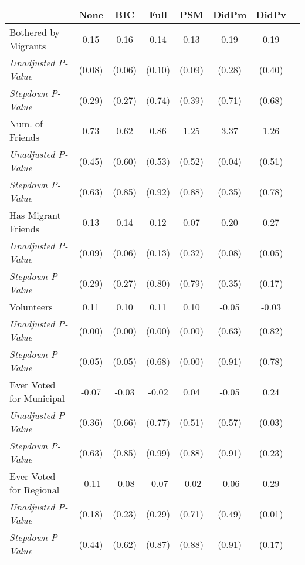 \begin{tabular}{l c c c c c c c}
\toprule
 & None & BIC & Full & PSM & DidPm & DidPv \\
\midrule
Bothered by Migrants & 0.15 & 0.16 & 0.14 & 0.13 & 0.19 & 0.19 \\
\quad \textit{Unadjusted P-Value} & (0.08) & (0.06) & (0.10) & (0.09) & (0.28) & (0.40) \\
\quad \textit{Stepdown P-Value} & (0.29) & (0.27) & (0.74) & (0.39) & (0.71) & (0.68) \\
Num. of Friends & 0.73 & 0.62 & 0.86 & 1.25 & 3.37 & 1.26 \\
\quad \textit{Unadjusted P-Value} & (0.45) & (0.60) & (0.53) & (0.52) & (0.04) & (0.51) \\
\quad \textit{Stepdown P-Value} & (0.63) & (0.85) & (0.92) & (0.88) & (0.35) & (0.78) \\
Has Migrant Friends & 0.13 & 0.14 & 0.12 & 0.07 & 0.20 & 0.27 \\
\quad \textit{Unadjusted P-Value} & (0.09) & (0.06) & (0.13) & (0.32) & (0.08) & (0.05) \\
\quad \textit{Stepdown P-Value} & (0.29) & (0.27) & (0.80) & (0.79) & (0.35) & (0.17) \\
Volunteers & 0.11 & 0.10 & 0.11 & 0.10 & -0.05 & -0.03 \\
\quad \textit{Unadjusted P-Value} & (0.00) & (0.00) & (0.00) & (0.00) & (0.63) & (0.82) \\
\quad \textit{Stepdown P-Value} & (0.05) & (0.05) & (0.68) & (0.00) & (0.91) & (0.78) \\
Ever Voted for Municipal & -0.07 & -0.03 & -0.02 & 0.04 & -0.05 & 0.24 \\
\quad \textit{Unadjusted P-Value} & (0.36) & (0.66) & (0.77) & (0.51) & (0.57) & (0.03) \\
\quad \textit{Stepdown P-Value} & (0.63) & (0.85) & (0.99) & (0.88) & (0.91) & (0.23) \\
Ever Voted for Regional & -0.11 & -0.08 & -0.07 & -0.02 & -0.06 & 0.29 \\
\quad \textit{Unadjusted P-Value} & (0.18) & (0.23) & (0.29) & (0.71) & (0.49) & (0.01) \\
\quad \textit{Stepdown P-Value} & (0.44) & (0.62) & (0.87) & (0.88) & (0.91) & (0.17) \\
\bottomrule
\end{tabular}
